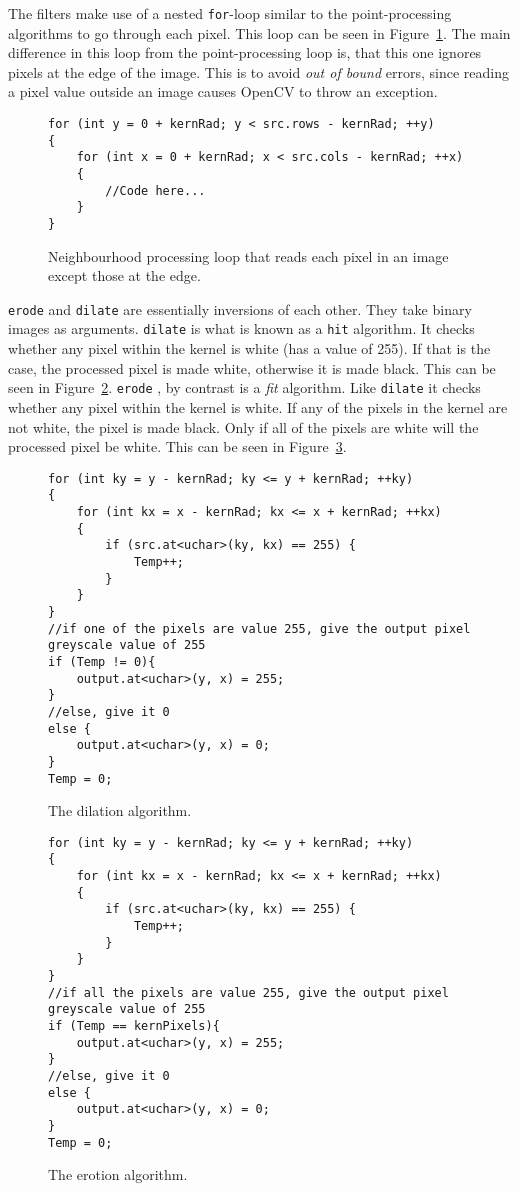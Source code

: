 The filters make use of a nested \texttt{for}-loop similar to the point-processing algorithms to go through each pixel. This loop can be seen in Figure~\ref{fig:neighbourhoodForLoop}. The main difference in this loop from the point-processing loop is, that this one ignores pixels at the edge of the image. This is to avoid \textit{out of bound} errors, since reading a pixel value outside an image causes OpenCV to throw an exception.

\begin{figure}
\begin{lstlisting}
for (int y = 0 + kernRad; y < src.rows - kernRad; ++y)
{
	for (int x = 0 + kernRad; x < src.cols - kernRad; ++x)
	{
		//Code here...
	}
}
\end{lstlisting}
\caption{Neighbourhood processing loop that reads each pixel in an image except those at the edge. \label{fig:neighbourhoodForLoop}}
\end{figure}

\texttt{erode} and \texttt{dilate} are essentially inversions of each other. They take binary images as arguments. \texttt{dilate} is what is known as a \texttt{hit} algorithm. It checks whether any pixel within the kernel is white (has a value of 255). If that is the case, the processed pixel is made white, otherwise it is made black. This can be seen in Figure~\ref{fig:dilateAlgorith}. \texttt{erode} , by contrast is a \textit{fit} algorithm. Like \texttt{dilate} it checks whether any pixel within the kernel is white. If any of the pixels in the kernel are not white, the pixel is made black. Only if all of the pixels are white will the processed pixel be white. This can be seen in Figure~\ref{fig:erodeAlgorithm}.

\begin{figure}
\begin{lstlisting}
for (int ky = y - kernRad; ky <= y + kernRad; ++ky)
{
	for (int kx = x - kernRad; kx <= x + kernRad; ++kx)
	{
		if (src.at<uchar>(ky, kx) == 255) {
			Temp++;
		}
	}
}
//if one of the pixels are value 255, give the output pixel greyscale value of 255
if (Temp != 0){
	output.at<uchar>(y, x) = 255;
}
//else, give it 0
else {
	output.at<uchar>(y, x) = 0;
}
Temp = 0;
\end{lstlisting}
\caption{The dilation algorithm. \label{fig:dilateAlgorith}}
\end{figure}

\begin{figure}
\begin{lstlisting}
for (int ky = y - kernRad; ky <= y + kernRad; ++ky)
{
	for (int kx = x - kernRad; kx <= x + kernRad; ++kx)
	{
		if (src.at<uchar>(ky, kx) == 255) {
			Temp++;
		}
	}
}
//if all the pixels are value 255, give the output pixel greyscale value of 255
if (Temp == kernPixels){
	output.at<uchar>(y, x) = 255;
}
//else, give it 0
else {
	output.at<uchar>(y, x) = 0;
}
Temp = 0;
\end{lstlisting}
\caption{The erotion algorithm.\label{fig:erodeAlgorithm}}
\end{figure}

